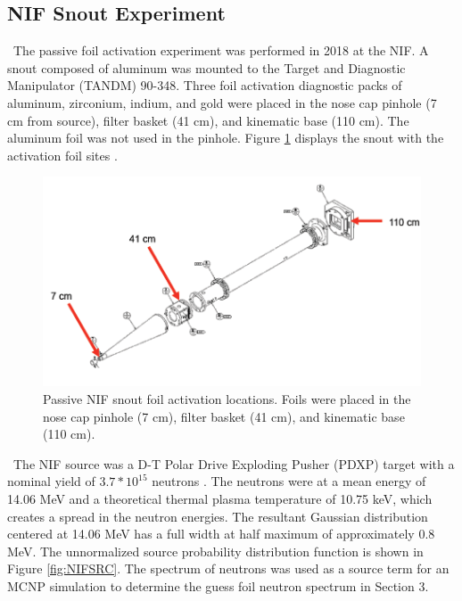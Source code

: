 \documentclass[journal]{IEEEtran}
\let\MYoriglatexcaption\caption
\renewcommand{\caption}[2][\relax]{\MYoriglatexcaption[#2]{#2}}
\begin{document}
\subsection{NIF Snout Experiment}

\ The passive foil activation experiment was performed in 2018 at the NIF. A snout composed of aluminum was mounted to the Target and Diagnostic Manipulator (TANDM) 90-348. Three foil activation diagnostic packs of aluminum, zirconium, indium, and gold were placed in the nose cap pinhole (7 cm from source), filter basket (41 cm), and kinematic base (110 cm). The aluminum foil was not used in the pinhole. Figure \ref{fig:NIF} displays the snout with the activation foil sites \cite{Bogetic}. 

\begin{figure}[h!]
	\includegraphics[width=\linewidth]{Figures/NIF.png}
	\caption{Passive NIF snout foil activation locations.  Foils were placed in the nose cap pinhole (7 cm), filter basket (41 cm), and kinematic base (110 cm).}
	\label{fig:NIF}
\end{figure}

\ The NIF source was a D-T Polar Drive Exploding Pusher (PDXP) target with a nominal yield of  $3.7*10^{15}$ neutrons \cite{NIFSrc}. The neutrons were at a mean energy of 14.06 MeV and a theoretical thermal plasma temperature of 10.75 keV, which creates a spread in the neutron energies. The resultant Gaussian distribution centered at 14.06 MeV has a full width at half maximum of approximately 0.8 MeV\cite{Appelbe}. The unnormalized source probability distribution function is shown in Figure \ref{fig:NIFSRC}. The spectrum of neutrons was used as a source term for an MCNP simulation to determine the guess foil neutron spectrum in Section 3. 
\end{document}
